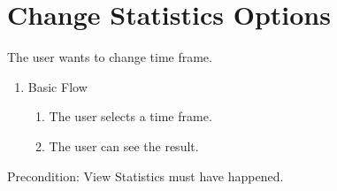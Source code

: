 \section{Change Statistics Options}
The user wants to change time frame.
\begin{enumerate}
  \item Basic Flow
  \begin{enumerate}
    \item The user selects a time frame.
    \item The user can see the result.
  \end{enumerate}
\end{enumerate}
Precondition: \newline
View Statistics must have happened.